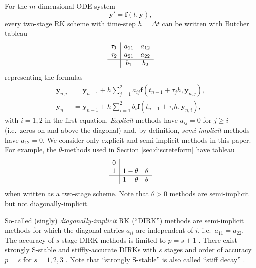\documentclass[final,leqno,onefignum,onetabnum]{siamltex1213bueler}
\newcommand\bbf{\mathbf{f}}
\newcommand\by{\mathbf{y}}
\begin{document}
For the $m$-dimensional ODE system
\begin{equation}
  \by' = \bbf(t,\by),  \label{eq:abstractODE}
\end{equation}
every two-stage RK scheme with time-step $h=\Delta t$ can be written with Butcher tableau \cite{AscherPetzold}
\begin{equation}
\begin{array}{c|cc}
\tau_1 & a_{11} & a_{12}  \\
\tau_2 & a_{21} & a_{22}  \\ \hline
       & b_1    & b_2     \\
\end{array}  \label{eq:tableau}
\end{equation}
representing the formulas
\begin{align*}
  \by_{n,i} &= \by_{n-1} + h \sum_{j=1}^2 a_{ij} \bbf(t_{n-1} + \tau_j h, \by_{n,j}), \\
      \by_n &= \by_{n-1} + h \sum_{i=1}^2 b_i \bbf(t_{n-1} + \tau_i h, \by_{n,i}),
\end{align*}
with $i=1,2$ in the first equation.  \emph{Explicit} methods have $a_{ij}=0$ for $j\ge i$ (i.e.~zeros on and above the diagonal) and, by definition, \emph{semi-implicit} methods have $a_{12}=0$.  We consider only explicit and semi-implicit methods in this paper.  For example, the $\theta$-methods used in Section \ref{sec:discreteform} have tableau
\begin{equation*}
\begin{array}{c|cc}
0 &          &   \\
1 & 1-\theta & \theta  \\ \hline
  & 1-\theta & \theta  \\
\end{array}
\end{equation*}
when written as a two-stage scheme.  Note that $\theta>0$ methods are semi-implicit but not diagonally-implicit.

So-called (singly) \emph{diagonally-implicit} RK (``DIRK'') methods are semi-implicit methods for which the diagonal entries $a_{ii}$ are independent of $i$, i.e.~$a_{11}=a_{22}$.  The accuracy of $s$-stage DIRK methods is limited to $p=s+1$ \cite{AscherPetzold}.  There exist strongly S-stable and stiffly-accurate \cite{AscherPetzold} DIRKs with $s$ stages and order of accuracy $p=s$ for $s=1,2,3$ \cite{Alexander1977}.  Note that ``strongly S-stable'' is also called ``stiff decay'' \cite{AscherPetzold}.
\end{document}
